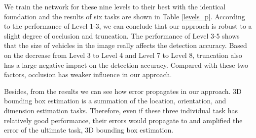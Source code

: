 \documentclass[a4paper,12pt]{article}
\begin{document}
\renewcommand{\arraystretch}{1.0}
\begin{table}[H]
	\centering
	\caption[Levels of difficulty.]{Levels of difficulty. Level 2, 6, and 8 corresponds to the Easy, Moderate, and Hard defined by KITTI \cite{Geiger2012CVPR}.}
	\label{levels_d}
\end{table}

We train the network for these nine levels to their best with the identical foundation and the results of six tasks are shown in Table \ref{levels_p}. According to the performance of Level 1-3, we can conclude that our approach is robust to a slight degree of occlusion and truncation.  The performance of Level 3-5 shows that the size of vehicles in the image really affects the detection accuracy. Based on the decrease from Level 3 to Level 4 and Level 7 to Level 8, truncation also has a large negative impact on the detection accuracy. Compared with these two factors, occlusion has weaker influence in our approach. 

Besides, from the results we can see how error propagates in our approach. 3D bounding box estimation is a summation of the location, orientation, and dimension estimation tasks. Therefore, even if these three individual task has relatively good performance, their errors would propagate to and amplified the error of the ultimate task, 3D bounding box estimation.
\end{document}

